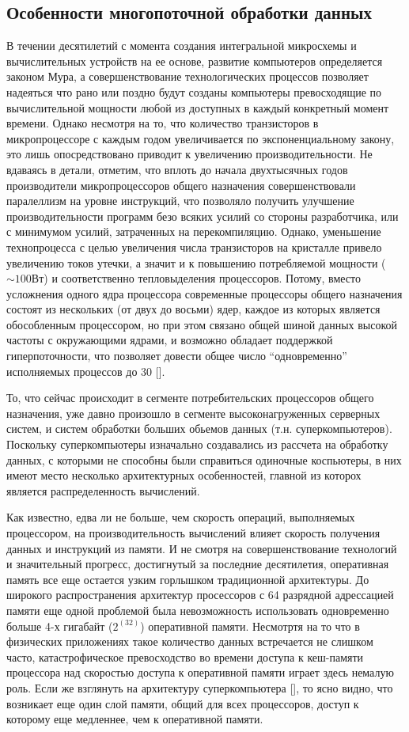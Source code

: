     \subsection{Особенности многопоточной обработки данных} %
    \label{sub:MultithreadMulticoreDataProcessing}
        В течении десятилетий с момента создания интегральной микросхемы и вычислительных устройств на ее основе, развитие компьютеров определяется законом Мура, а совершенствование технологических процессов позволяет надеяться что рано или поздно будут созданы компьютеры превосходящие по вычислительной мощности любой из доступных в каждый конкретный момент времени. Однако несмотря на то, что количество транзисторов в микропроцессоре с каждым годом увеличивается по экспоненциальному закону, это лишь опосредствовано приводит к увеличению производительности. Не вдаваясь в детали, отметим, что вплоть до начала двухтысячных годов производители микропроцессоров общего назначения совершенствовали паралеллизм на уровне инструкций, что позволяло получить улучшение производительности программ безо всяких усилий со стороны разработчика, или с минимумом усилий, затраченных на перекомпиляцию. Однако, уменьшение технопроцесса с целью увеличения числа транзисторов на кристалле привело увеличению токов утечки, а значит и к повышению потребляемой мощности ($\sim 100 Вт$) и соответственно тепловыделения процессоров. Потому, вместо усложнения одного ядра процессора современные процессоры общего назначения состоят из нескольких (от двух до восьми) ядер, каждое из которых является обособленным процессором, но при этом связано общей шиной данных высокой частоты с окружающими ядрами, и возможно обладает поддержкой гиперпоточности, что позволяет довести общее число ``одновременно'' исполняемых процессов до 30 [].

        То, что сейчас происходит в сегменте потребительских процессоров общего назначения, уже давно произошло в сегменте высоконагруженных серверных систем, и систем обработки больших обьемов данных (т.н. суперкомпьютеров). Поскольку суперкомпьютеры изначально создавались из рассчета на обработку данных, с которыми не способны были справиться одиночные коспьютеры, в них имеют место несколько архитектурных особенностей, главной из которох является распределенность вычислений.

        Как известно, едва ли не больше, чем скорость операций, выполняемых процессором, на производительность вычислений влияет скорость получения данных и инструкций из памяти. И не смотря на совершенствование технологий и значительный прогресс, достигнутый за последние десятилетия, оперативная память все еще остается узким горлышком традиционной архитектуры. До широкого распространения архитектур просессоров с 64 разрядной адрессацией памяти еще одной проблемой была невозможность использовать одновременно больше 4-х гигабайт ($2^(32)$) оперативной памяти. Несмотртя на то что в физических приложениях такое количество данных встречается не слишком часто, катастрофическое превосходство во времени доступа к кеш-памяти процессора над скоростью доступа к оперативной памяти играет здесь немалую роль. Если же взглянуть на архитектуру суперкомпьютера [], то ясно видно, что возникает еще один слой памяти, общий для всех процессоров, доступ к которому еще медленнее, чем к оперативной памяти.

